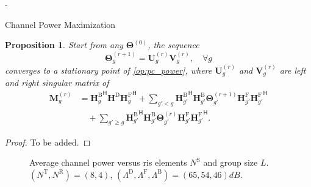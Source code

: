 \documentclass[journal]{IEEEtran}
\newtheorem{proposition}{Proposition}
\begin{document}
\begin{section}{-}
\begin{subsection}{Channel Power Maximization}
		\begin{proposition}
			Start from any $\mathbf{\Theta}^{(0)}$, the sequence
			\begin{equation}
				\mathbf{\Theta}_g^{(r+1)} = \mathbf{U}_g^{(r)} \mathbf{V}_g^{(r)}, \quad \forall g
			\end{equation}
			converges to a stationary point of \eqref{op:pc_power}, where $\mathbf{U}_g^{(r)}$ and $\mathbf{V}_g^{(r)}$ are left and right singular matrix of
			\begin{equation}
				\begin{split}
					\mathbf{M}_g^{(r)}
					& = {\mathbf{H}_g^\mathrm{B}}^\mathsf{H} \mathbf{H}^\mathrm{D} {\mathbf{H}_g^\mathrm{F}}^\mathsf{H} + \sum_{g' < g} {\mathbf{H}_{g'}^\mathrm{B}}^\mathsf{H} \mathbf{H}_{g'}^\mathrm{B} \mathbf{\Theta}_{g'}^{(r+1)} \mathbf{H}_{g'}^\mathrm{F} {\mathbf{H}_{g'}^\mathrm{F}}^\mathsf{H} \\
					& \quad + \sum_{g' \ge g} {\mathbf{H}_{g'}^\mathrm{B}}^\mathsf{H} \mathbf{H}_{g'}^\mathrm{B} \mathbf{\Theta}_{g'}^{(r)} \mathbf{H}_{g'}^\mathrm{F} {\mathbf{H}_{g'}^\mathrm{F}}^\mathsf{H}.
				\end{split}
			\end{equation}
		\end{proposition}

		\begin{proof}
			To be added.
		\end{proof}

		\begin{figure}[!t]
			\centering
			\resizebox{0.65\columnwidth}{!}{
				
			}
			\caption{Average channel power versus \gls{ris} elements $N^\mathrm{S}$ and group size $L$. $(N^\mathrm{T}, N^\mathrm{R}) = (8, 4)$, $(\Lambda^\mathrm{D}, \Lambda^\mathrm{F}, \Lambda^\mathrm{B}) = (65, 54, 46) \unit{dB}$.}
			\label{sm:pc_power_sx}
		\end{figure}


\end{subsection}
\end{section}
\end{document}
